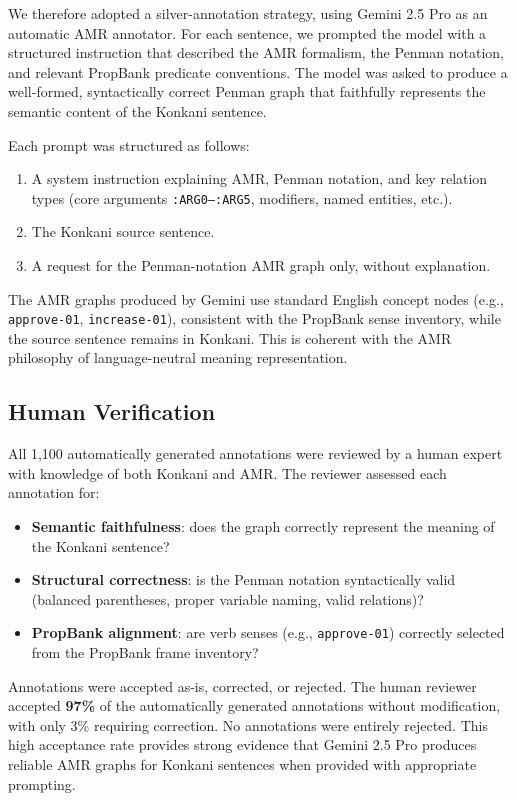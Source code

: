 We therefore adopted a silver-annotation strategy, using Gemini 2.5 Pro as an automatic AMR annotator. For each sentence, we prompted the model with a structured instruction that described the AMR formalism, the Penman notation, and relevant PropBank predicate conventions. The model was asked to produce a well-formed, syntactically correct Penman graph that faithfully represents the semantic content of the Konkani sentence.

Each prompt was structured as follows:
\begin{enumerate}
    \item A system instruction explaining AMR, Penman notation, and key relation types (core arguments \texttt{:ARG0–:ARG5}, modifiers, named entities, etc.).
    \item The Konkani source sentence.
    \item A request for the Penman-notation AMR graph only, without explanation.
\end{enumerate}

The AMR graphs produced by Gemini use standard English concept nodes (e.g., \texttt{approve-01}, \texttt{increase-01}), consistent with the PropBank sense inventory, while the source sentence remains in Konkani. This is coherent with the AMR philosophy of language-neutral meaning representation.

\subsection{Human Verification}

All 1,100 automatically generated annotations were reviewed by a human expert with knowledge of both Konkani and AMR. The reviewer assessed each annotation for:
\begin{itemize}
    \item \textbf{Semantic faithfulness}: does the graph correctly represent the meaning of the Konkani sentence?
    \item \textbf{Structural correctness}: is the Penman notation syntactically valid (balanced parentheses, proper variable naming, valid relations)?
    \item \textbf{PropBank alignment}: are verb senses (e.g., \texttt{approve-01}) correctly selected from the PropBank frame inventory?
\end{itemize}

Annotations were accepted as-is, corrected, or rejected. The human reviewer accepted \textbf{97\%} of the automatically generated annotations without modification, with only 3\% requiring correction. No annotations were entirely rejected. This high acceptance rate provides strong evidence that Gemini 2.5 Pro produces reliable AMR graphs for Konkani sentences when provided with appropriate prompting.

